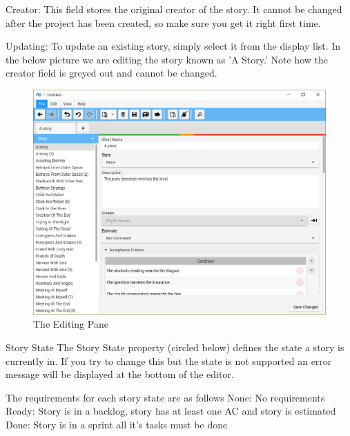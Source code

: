 Creator:
This field stores the original creator of the story. It cannot be changed after the project has been created, so make sure you get it right first time.

Updating:
To update an existing story, simply select it from the display list. In the below picture we are editing the story known as 'A Story.' Note how the creator field is greyed out and cannot be changed.

\begin{figure}[H]
\centering
\includegraphics[width=\textwidth]{images/screenshots/stories3.PNG}
\caption{The Editing Pane}
\label{fig:new_project}
\end{figure}

Story State\newline
The Story State property (circled below) defines the state a story is currently in. If you try to change this but the state is not supported an error message will be displayed at the bottom of the editor. \newline

The requirements for each story state are as follows\newline
None: No requirements\newline
Ready: Story is in a backlog, story has at least one AC and story is estimated
Done: Story is in a sprint all it's tasks must be done

